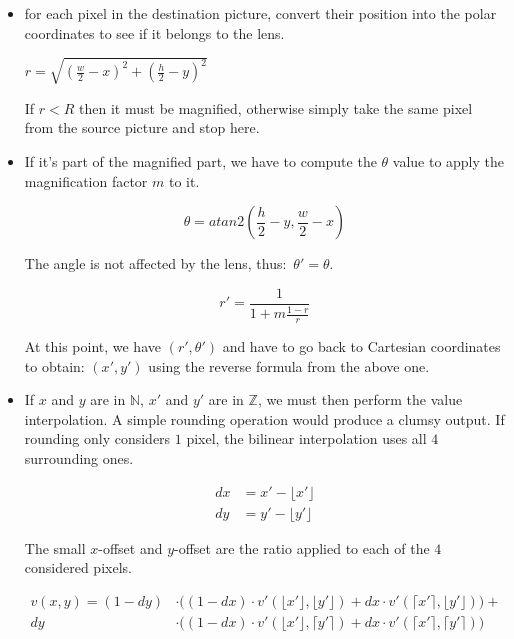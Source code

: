 \documentclass[10pt,a4paper]{article}
\begin{document}
\begin{itemize}
    \item for each pixel in the destination picture, convert their position
    into the polar coordinates to see if it belongs to the lens.

    $r = \sqrt{(\frac{w}{2}-x)^2 + (\frac{h}{2}-y)^2}$

    If $r < R$ then it must be magnified, otherwise simply take the same pixel
    from the source picture and stop here.

    \item If it's part of the magnified part, we have to compute the
    $\theta$ value to apply the magnification factor $m$ to it.

    $$\theta = atan2(\frac{h}{2} - y, \frac{w}{2} - x)$$

    The angle is not affected by the lens, thus: $\theta\prime = \theta$.

    $$r\prime = \frac{1}{1 + m\frac{1-r}{r}}$$

    At this point, we have $(r\prime, \theta\prime)$ and have to go back to
    Cartesian coordinates to obtain: $(x\prime, y\prime)$ using the reverse
    formula from the above one.

    \item If $x$ and $y$ are in $\mathbb{N}$, $x\prime$ and $y\prime$ are in
    $\mathbb{Z}$, we must then perform the value interpolation. A simple
    rounding operation would produce a clumsy output. If rounding only
    considers $1$ pixel, the bilinear interpolation uses all $4$ surrounding
    ones.

    \begin{align}
    dx &= x\prime - \lfloor{}x\prime\rfloor{} \\
    dy &= y\prime - \lfloor{}y\prime\rfloor{}
    \end{align}

    The small $x$-offset and $y$-offset are the ratio applied to each of the
    $4$ considered pixels.

    \begin{align*}
    v(x, y) =
    (1-dy) &\cdot \big(
        (1-dx) \cdot v\prime(\lfloor{}x\prime\rfloor{},\lfloor{}y\prime\rfloor{}) +
        dx \cdot v\prime(\lceil{}x\prime\rceil{},\lfloor{}y\prime\rfloor{})
    \big) + \\
    dy &\cdot \big(
        (1-dx) \cdot v\prime(\lfloor{}x\prime\rfloor{},\lceil{}y\prime\rceil{}) +
        dx \cdot v\prime(\lceil{}x\prime\rceil{},\lceil{}y\prime\rceil{})
    \big)
    \end{align*}

\end{itemize}
\end{document}
